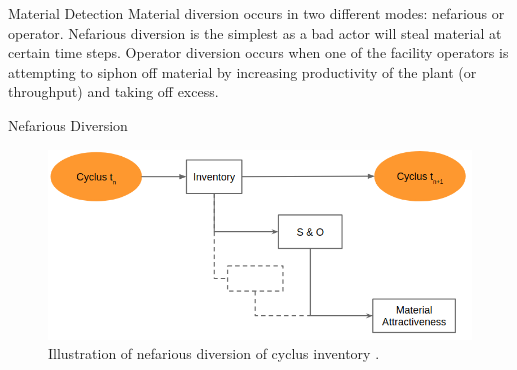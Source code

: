\documentclass[final]{beamer}
\newlength{\onecolwid}
\newlength{\threecolwid}
\begin{document}
\begin{frame}[t]
\begin{columns}[t,totalwidth=\threecolwid]
\begin{column}{\onecolwid}
\begin{block}{Material Detection}
        Material diversion occurs in two different modes: nefarious or operator.
        Nefarious diversion is the simplest as a bad actor will steal material at certain time steps.
        Operator diversion occurs when one of the facility operators is attempting to siphon off material
        by increasing productivity of the plant (or throughput) and taking off excess.
        
        
	\begin{block} {Nefarious Diversion}
		\begin{figure}
			\includegraphics[width=0.9\linewidth]{diversion1.png}
			\caption{Illustration of nefarious diversion of cyclus inventory \cite{Yilmaz_2016}.}
		\end{figure}
		

\end{block}
\end{block}
\end{column}
\end{columns}
\end{frame}
\end{document}
